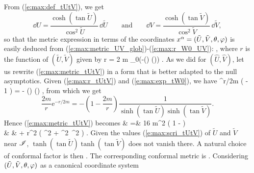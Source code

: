 From (\ref{e:max:def_tUtV}), we get
\[
    \dd U = \frac{\cosh(\tan\tilde{U})}{\cos^2\tilde{U}}\, \dd\tilde{U}
    \qquad\mbox{and}\qquad
    \dd V = \frac{\cosh(\tan\tilde{V})}{\cos^2\tilde{V}}\, \dd\tilde{V} ,
\]
so that the metric expression in terms of the coordinates
$x^\alpha=(\tilde{U},\tilde{V},\theta,\varphi)$ is easily deduced from
(\ref{e:max:metric_UV_glob})-(\ref{e:max:r_W0_UV}):
\be \label{e:max:metric_tUtV}
    ,
\ee
where $r$ is the function of $(\tilde{U},\tilde{V})$ given by
\be \label{e:max:r_tUtV}
    r = 2 m _0\!\left(-\sinh(\tan {}) \sinh(\tan {})\right) .
\ee
As we did for $(\hat{U},\hat{V})$, let us rewrite (\ref{e:max:metric_tUtV}) in
a form that is better adapted to the null asymptotics.
Given (\ref{e:max:r_tUtV}) and (\ref{e:max:exp_tW0}), we have
\be \label{e:max:exp_r_tUtV}
    ^{r/2m} \left(  - 1 \right) =
        - \sinh(\tan {}) \sinh(\tan {}) ,
\ee
from which we get
\[
    \frac{2m}{r} \mathrm{e}^{-r/2m} = - \left( 1 - \frac{2m}{r} \right)
        \frac{1}{\sinh(\tan \tilde{U}) \sinh(\tan \tilde{V})} .
\]
Hence (\ref{e:max:metric_tUtV}) becomes
\bea
     & =&
    16 m^2 \left( 1 -  \right)
     \nonumber\\
    & &
     +  r^2 \left( \dd\th^2 + \sin^2\th\, \dd\ph^2 \right) .
\eea
Given the values (\ref{e:max:scri_tUtV}) of $\tilde{U}$ and $\tilde{V}$ near
$\mathscr{I}$, $\tanh(\tan\tilde{U}) \tanh(\tan\tilde{V})$ does not vanish there.
A natural choice of conformal factor is then
\be \label{e:max:def_Omega_tUtV}
   .
\ee
The corresponding conformal metric is
\be \label{e:max:conf_metric_tUtV}
     .
\ee
Considering $(\tilde{U},\tilde{V},\theta,\varphi)$ as a canonical coordinate system
